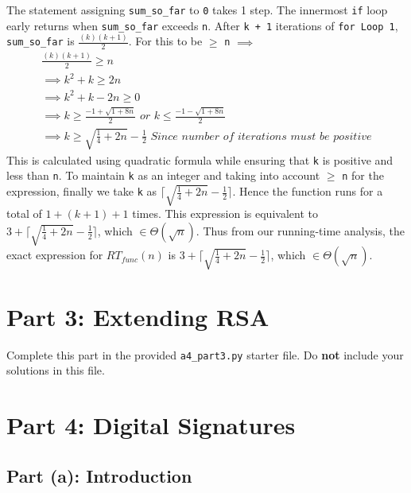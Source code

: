 \documentclass[11pt]{article}
\begin{document}
\begin{enumerate}
The statement assigning \texttt{sum\_so\_far} to \texttt{0} takes 1 step. The innermost \texttt{if} loop early returns when \texttt{sum\_so\_far} exceeds \texttt{n}. After \texttt{k + 1} iterations of \texttt{for Loop 1}, \texttt{sum\_so\_far} is $\frac{(k)(k + 1)}{2}$. \newline For this to be $\geq$ \texttt{n} $\implies$
\begin{gather*}
\frac{(k)(k + 1)}{2} \geq n \\
\implies k^2 + k \geq 2n  \\
\implies k^2 + k - 2n \geq 0 \\
\implies k \geq \frac{-1 + \sqrt{1 + 8n}}{2} \textit{ or } k \leq \frac{-1 - \sqrt{1 + 8n}}{2}\\
\implies k \geq \sqrt{\frac{1}{4} + 2n} - \frac{1}{2} \textit{ Since number of iterations must be positive}
\end{gather*}
This is calculated using quadratic formula while ensuring that \texttt{k} is positive and less than \texttt{n}. \newline To maintain \texttt{k} as an integer and taking into account $\geq$ \texttt{n} for the expression, finally \newline we take \texttt{k} as $\lceil \sqrt{\frac{1}{4} + 2n} - \frac{1}{2} \rceil$. Hence the function runs for a total of $1 + (k+1) + 1$ times. This expression is equivalent to $ 3 + \lceil \sqrt{\frac{1}{4} + 2n} - \frac{1}{2} \rceil$, which $\in \Theta(\sqrt{n})$. Thus from our running-time analysis, the exact expression for $RT_{func}(n)$ is $3 + \lceil \sqrt{\frac{1}{4} + 2n} - \frac{1}{2} \rceil$, which $\in \Theta(\sqrt{n})$. 
\end{enumerate}

\newpage

\section*{Part 3: Extending RSA}

Complete this part in the provided \texttt{a4\_part3.py} starter file.
Do \textbf{not} include your solutions in this file.

\section*{Part 4: Digital Signatures}

\subsection*{Part (a): Introduction}
\end{document}
